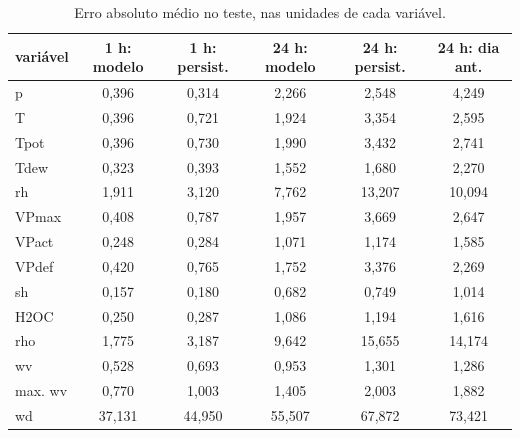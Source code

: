 \begin{table}[!t]
\centering
\caption{Erro absoluto médio no teste, nas unidades de cada variável.}
\label{tab:mae}
\begin{tabular}{lccccc}
\hline
variável & 1 h: modelo & 1 h: persist. & 24 h: modelo & 24 h: persist. & 24 h: dia ant. \\
\hline
p & 0,396 & 0,314 & 2,266 & 2,548 & 4,249 \\
T & 0,396 & 0,721 & 1,924 & 3,354 & 2,595 \\
Tpot & 0,396 & 0,730 & 1,990 & 3,432 & 2,741 \\
Tdew & 0,323 & 0,393 & 1,552 & 1,680 & 2,270 \\
rh & 1,911 & 3,120 & 7,762 & 13,207 & 10,094 \\
VPmax & 0,408 & 0,787 & 1,957 & 3,669 & 2,647 \\
VPact & 0,248 & 0,284 & 1,071 & 1,174 & 1,585 \\
VPdef & 0,420 & 0,765 & 1,752 & 3,376 & 2,269 \\
sh & 0,157 & 0,180 & 0,682 & 0,749 & 1,014 \\
H2OC & 0,250 & 0,287 & 1,086 & 1,194 & 1,616 \\
rho & 1,775 & 3,187 & 9,642 & 15,655 & 14,174 \\
wv & 0,528 & 0,693 & 0,953 & 1,301 & 1,286 \\
max. wv & 0,770 & 1,003 & 1,405 & 2,003 & 1,882 \\
wd & 37,131 & 44,950 & 55,507 & 67,872 & 73,421 \\
\hline
\end{tabular}
\end{table}